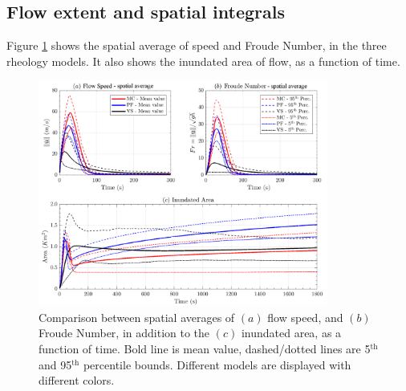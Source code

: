 \documentclass{article}
\begin{document}
\subsection{Flow extent and spatial integrals}
Figure \ref{fig:Colima-spatial} shows the spatial average of speed and Froude Number, in the three rheology models. It also shows the inundated area of flow, as a function of time. 
\begin{figure}[H]
        \centering
        \includegraphics[width=0.85\textwidth]{BAF_VolcanDeColima/AveragedMeasurments/Averaged_MeasuresColima.png}
        \caption{Comparison between spatial averages of $(a)$ flow speed, and $(b)$ Froude Number, in addition to the $(c)$ inundated area, as a function of time. Bold line is mean value, dashed/dotted lines are 5$^{\mathrm{th}}$ and 95$^{\mathrm{th}}$ percentile bounds. Different models are displayed with different colors.}
        \label{fig:Colima-spatial}
\end{figure}
\end{document}
